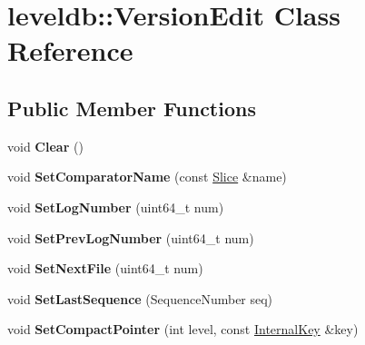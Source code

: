 \hypertarget{classleveldb_1_1_version_edit}{}\section{leveldb\+::Version\+Edit Class Reference}
\label{classleveldb_1_1_version_edit}
\subsection*{Public Member Functions}
\begin{DoxyCompactItemize}
\item 
\mbox{\label{classleveldb_1_1_version_edit_a259c9de14d58e231178904c1559e4b5e}} 
void {\bfseries Clear} ()
\item 
\mbox{\label{classleveldb_1_1_version_edit_ab562147cdd82b184e86e88bd375a718c}} 
void {\bfseries Set\+Comparator\+Name} (const \mbox{\hyperlink{classleveldb_1_1_slice}{Slice}} \&name)
\item 
\mbox{\label{classleveldb_1_1_version_edit_a47e5c58d34b0e27dc8990687e0c5477a}} 
void {\bfseries Set\+Log\+Number} (uint64\+\_\+t num)
\item 
\mbox{\label{classleveldb_1_1_version_edit_ac1b5689f62e7a8f63c4eefa437a4f2f3}} 
void {\bfseries Set\+Prev\+Log\+Number} (uint64\+\_\+t num)
\item 
\mbox{\label{classleveldb_1_1_version_edit_a4c104515adf573be0ead29e6835f14fb}} 
void {\bfseries Set\+Next\+File} (uint64\+\_\+t num)
\item 
\mbox{\label{classleveldb_1_1_version_edit_abd6e841ed400672d33d26f4b187a66bf}} 
void {\bfseries Set\+Last\+Sequence} (Sequence\+Number seq)
\item 
\mbox{\label{classleveldb_1_1_version_edit_ac9b26dfba1188705d7fc4deaf047271c}} 
void {\bfseries Set\+Compact\+Pointer} (int level, const \mbox{\hyperlink{classleveldb_1_1_internal_key}{Internal\+Key}} \&key)
\item 
\mbox{\label{classleveldb_1_1_version_edit_a4cd5cc92761b7ae5b5f9cff46cb88263}} 

\end{DoxyCompactItemize}
